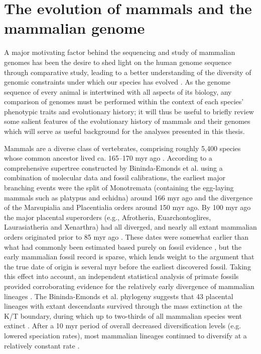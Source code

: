\section{The evolution of mammals and the mammalian genome}
\label{section_mammal_evolution}

A major motivating factor behind the sequencing and study of mammalian
genomes has been the desire to shed light on the human genome sequence
through comparative study, leading to a better understanding of the
diversity of genomic constraints under which our species has evolved
\citep{Mouse2002Initial}. As the genome sequence of every animal is
intertwined with all aspects of its biology, any comparison of genomes
must be performed within the context of each species' phenotypic
traits and evolutionary history; it will thus be useful to briefly
review some salient features of the evolutionary history of mammals
and their genomes which will serve as useful background for the
analyses presented in this thesis.

Mammals are a diverse class of vertebrates, comprising roughly 5,400
species whose common ancestor lived ca. 165--170 \ac{myr} ago
\citep{Wilson2005}. According to a comprehensive supertree constructed
by Bininda-Emonds et al. using a combination of molecular data and
fossil calibrations, the earliest major branching events were the
split of Monotremata (containing the egg-laying mammals such as
platypus and echidna) around 166 \ac{myr} ago and the divergence of
the Marsupialia and Placentialia orders around 150 \ac{myr} ago. By
100 \ac{myr} ago the major placental superorders (e.g., Afrotheria,
Euarchontoglires, Laurasiatheria and Xenarthra) had all diverged, and
nearly all extant mammalian orders originated prior to 85 \ac{myr} ago
\citep{BinindaEmonds2007}. These dates were somewhat earlier than what
had commonly been estimated based purely on fossil evidence
\citep{Archibald2001}, but the early mammalian fossil record is
sparse, which lends weight to the argument that the true date of
origin is several \ac{myr} before the earliest discovered
fossil. Taking this effect into account, an independent statistical
analysis of primate fossils provided corroborating evidence for the
relatively early divergence of mammalian lineages
\citep{Martin2007}. The Bininda-Emonds et al. phylogeny suggests that
43 placental lineages with extant descendants survived through the
mass extinction at the K/T boundary, during which up to two-thirds of
all mammalian species went extinct \citep{Alroy1999}. After a 10
\ac{myr} period of overall decreased diversification levels
(e.g. lowered speciation rates), most mammalian lineages continued to
diversify at a relatively constant rate
\citep{BinindaEmonds2007,Martin2007}.

